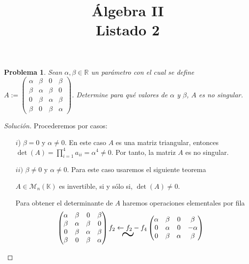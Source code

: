 \documentclass{article}
\title{\color{azul}\textbf{Álgebra II}\\
	\textbf{Listado 2}}
\author{\color{azul}\autor}
\date{\color{azul}\fecha}
\newtheorem{pro}{Problema}
\begin{document}
\begin{pro}
    Sean $\alpha,\beta\in \mathbb{R}$ un parámetro con el cual se define $A := \begin{pmatrix}
            \alpha & \beta  & 0      & \beta  \\
            \beta  & \alpha & \beta  & 0      \\
            0      & \beta  & \alpha & \beta  \\
            \beta  & 0      & \beta  & \alpha
        \end{pmatrix}$. Determine para qué valores de $\alpha$ y $\beta$, $A$ es no singular.
\end{pro}
\begin{proof}[Solución]
    Procederemos por casos:
    \begin{itemize}
        \item[$i$)] $\beta = 0$ y $\alpha \neq 0$. En este caso $A$ es una matriz triangular, entonces $\displaystyle\det\left(A\right) = \prod_{i=1}^{4}a_{ii} = \alpha^{4} \neq 0$. Por tanto, la matriz $A$ es no singular.
        \item[$ii)$] $\beta\neq 0$ y $\alpha \neq 0$. Para este caso usaremos el siguiente teorema
            \begin{tcolorbox}[title= \textbf{Teorema},colback=blue!4,colframe=blue!30!black!80,colbacktitle=blue!30!black!80]
                $A\in \mathcal{M}_{n}(\mathbb{K})$ es invertible, si y sólo si, $\det(A)\neq 0.$
            \end{tcolorbox}
            Para obtener el determinante de $A$ haremos operaciones elementales por fila
            \begin{align*}
                 & \begin{pmatrix}
                       \alpha & \beta  & 0      & \beta  \\
                       \beta  & \alpha & \beta  & 0      \\
                       0      & \beta  & \alpha & \beta  \\
                       \beta  & 0      & \beta  & \alpha
                   \end{pmatrix} \underset{\text{\Huge$\sim$}}{f_{2}\leftarrow f_{2}-f_{4}}
                \begin{pmatrix}
                    \alpha & \beta  & 0      & \beta   \\
                    0      & \alpha & 0      & -\alpha \\
                    0      & \beta  & \alpha & \beta   \\

\end{pmatrix}
\end{align*}
\end{itemize}
\end{proof}
\end{document}
